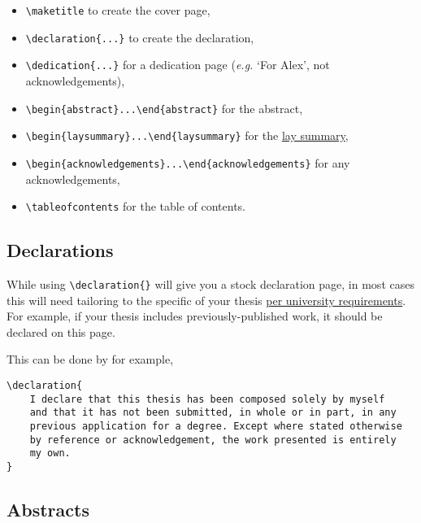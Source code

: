 \documentclass[12pt]{article}
\begin{document}
\begin{itemize}
	\item \lstinline|\maketitle| to create the cover page,
	\item \lstinline|\declaration{...}| to create the declaration,
	\item \lstinline|\dedication{...}| for a dedication page ({\it e.g.\/} `For Alex', not acknowledgements),
	\item \lstinline|\begin{abstract}...\end{abstract}| for the abstract,
	\item \lstinline|\begin{laysummary}...\end{laysummary}| for the \href{https://www.ed.ac.uk/sites/default/files/atoms/files/lay_summary_in_theses.pdf}{lay summary},
	\item \lstinline|\begin{acknowledgements}...\end{acknowledgements}| for any acknowledgements,
	\item \lstinline|\tableofcontents| for the table of contents.
\end{itemize}

\subsection{Declarations}

While using \lstinline|\declaration{}| will give you a stock declaration page, in most cases this will need tailoring to the specific of your thesis \href{https://www.ed.ac.uk/sites/default/files/atoms/files/thesis_signed_declaration.pdf}{per university requirements}. For example, if your thesis includes previously-published work, it should be declared on this page.

This can be done by for example,
\begin{lstlisting}
\declaration{
    I declare that this thesis has been composed solely by myself
    and that it has not been submitted, in whole or in part, in any
    previous application for a degree. Except where stated otherwise
    by reference or acknowledgement, the work presented is entirely
    my own.
}
\end{lstlisting}

\subsection{Abstracts}
\end{document}
